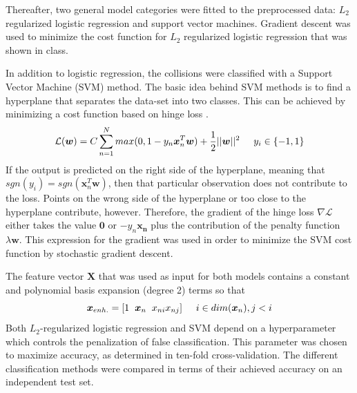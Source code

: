 \documentclass[10pt,conference,compsocconf]{IEEEtran}
\begin{document}
\par
Thereafter, two general model categories were fitted to the preprocessed data: $L_2$ regularized logistic regression and support vector machines. Gradient descent was used to minimize the cost function for $L_2$ regularized logistic regression that was shown in class.
\par
In addition to logistic regression, the collisions were classified with a Support Vector Machine (SVM) method. The basic idea behind SVM methods is to find a hyperplane that separates the data-set into two classes. This can be achieved by minimizing a cost function based on hinge loss \cite{SVM_ref}.
\begin{equation}
\mathcal{L}(\boldsymbol{w}) = C \sum_{n=1}^N max(0,1-y_n \boldsymbol{x}_n^T\boldsymbol{w}) + \frac{1}{2}||\boldsymbol{w}||^2 \hspace{5mm} y_i \in \{-1,1\}
\end{equation}  
If the output is predicted on the right side of the hyperplane, meaning that $sgn(y_i) = sgn(\boldsymbol{x}_n^T\boldsymbol{w})$, then that particular observation does not contribute to the loss. Points on the wrong side of the hyperplane or too close to the hyperplane contribute, however. Therefore, the gradient of the hinge loss $\nabla \mathcal{L}$ either takes the value $\boldsymbol{0}$ or $-y_n\boldsymbol{x_n}$ plus the contribution of the penalty function $\lambda \boldsymbol{w}$. This expression for the gradient was used in order to minimize the SVM cost function by stochastic gradient descent.
\par
The feature vector $\boldsymbol{X}$ that was used as input for both models contains a constant and polynomial basis expansion (degree 2) terms so that
\begin{equation}
\boldsymbol{x}_{enh.} = [1 \hspace{2mm} \boldsymbol{x}_n \hspace{2mm} x_{ni} x_{nj}] \hspace{5mm} i \in dim(\boldsymbol{x}_n), j < i
\end{equation}
Both $L_2$-regularized logistic regression and SVM depend on a hyperparameter which controls the penalization of false classification. This parameter was chosen to maximize accuracy, as determined in ten-fold cross-validation. The different classification methods were compared in terms of their achieved accuracy on an independent test set. 
\end{document}
